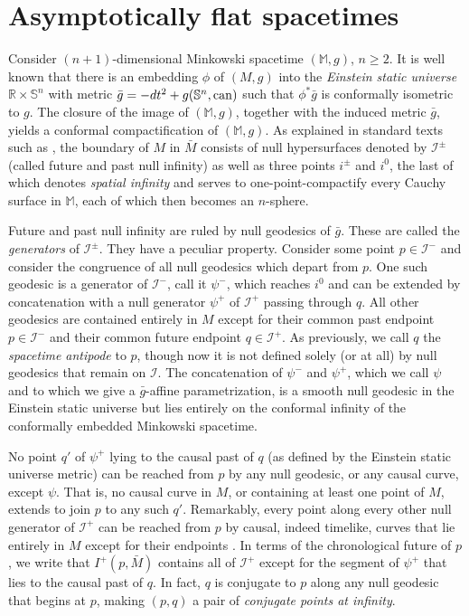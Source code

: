 \documentclass[12pt]{amsart}
\numberwithin{equation}{section}
\begin{document}
\section{Asymptotically flat spacetimes} \label{section5}
\setcounter{equation}{0}

\noindent Consider $(n+1)$-dimensional Minkowski spacetime $({\mathbb M}, g)$, $n\ge 2$. It is well known that there is an embedding $\phi$ of $(M,g)$ into the \emph{Einstein static universe} ${\mathbb R}\times {\mathbb S}^n$ with metric ${\bar g}=-dt^2+g({\mathbb S}^n,{\rm can})$ such that $\phi^* {\bar g}$ is conformally isometric to $g$. The closure of the image of $({\mathbb M}, g)$, together with the induced metric ${\bar g}$, yields a conformal compactification of $({\mathbb M}, g)$. As explained in standard texts such as \cite{Wald}, the boundary of $M$ in ${\bar M}$ consists of null hypersurfaces denoted by ${\mathcal I}^{\pm}$ (called future and past null infinity) as well as three points $i^{\pm}$ and $i^0$, the last of which denotes \emph{spatial infinity} and serves to one-point-compactify every Cauchy surface in ${\mathbb M}$, each of which then becomes an $n$-sphere.

Future and past null infinity are ruled by null geodesics of ${\bar g}$. These are called the \emph{generators} of ${\mathcal I}^{\pm}$. They have a peculiar property. Consider some point $p\in {\mathcal I}^-$ and consider the congruence of all null geodesics which depart from $p$. One such geodesic is a generator of ${\mathcal I}^-$, call it $\psi^-$, which reaches $i^0$ and can be extended by concatenation with a null generator $\psi^+$ of ${\mathcal I}^+$ passing through $q$. All other geodesics are contained entirely in $M$ except for their common past endpoint $p\in {\mathcal I}^-$ and their common future endpoint $q\in{\mathcal I}^+$. As previously, we call $q$ the \emph{spacetime antipode} to $p$, though now it is not defined solely (or at all) by null geodesics that remain on ${\mathcal I}$. The concatenation of $\psi^-$ and $\psi^+$, which we call $\psi$ and to which we give a ${\bar g}$-affine parametrization, is a smooth null geodesic in the Einstein static universe but lies entirely on the conformal infinity of the conformally embedded Minkowski spacetime.

No point $q'$ of $\psi^+$ lying to the causal past of $q$ (as defined by the Einstein static universe metric) can be reached from $p$ by any null geodesic, or any causal curve, except $\psi$. That is, no causal curve in $M$, or containing at least one point of $M$, extends to join $p$ to any such $q'$. Remarkably, every point along every other null generator of ${\mathcal I}^+$ can be reached from $p$ by causal, indeed timelike, curves that lie entirely in $M$ except for their endpoints \cite{PSW, Cameron}. In terms of the chronological future of $p$, we write that $I^+(p,{\bar M})$ contains all of ${\mathcal I}^+$ except for the segment of $\psi^+$ that lies to the causal past of $q$. In fact, $q$ is conjugate to $p$ along any null geodesic that begins at $p$, making $(p,q)$ a pair of \emph{conjugate points at infinity}.
\end{document}
